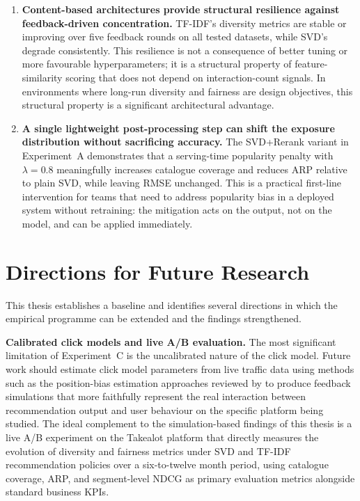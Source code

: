 \documentclass[11pt,a4paper]{report}
\begin{document}
\begin{enumerate}
    \item \textbf{Content-based architectures provide structural resilience against feedback-driven concentration.} TF-IDF's diversity metrics are stable or improving over five feedback rounds on all tested datasets, while SVD's degrade consistently. This resilience is not a consequence of better tuning or more favourable hyperparameters; it is a structural property of feature-similarity scoring that does not depend on interaction-count signals. In environments where long-run diversity and fairness are design objectives, this structural property is a significant architectural advantage.

    \item \textbf{A single lightweight post-processing step can shift the exposure distribution without sacrificing accuracy.} The SVD+Rerank variant in Experiment~A demonstrates that a serving-time popularity penalty with $\lambda = 0.8$ meaningfully increases catalogue coverage and reduces ARP relative to plain SVD, while leaving RMSE unchanged. This is a practical first-line intervention for teams that need to address popularity bias in a deployed system without retraining: the mitigation acts on the output, not on the model, and can be applied immediately.
\end{enumerate}

\section{Directions for Future Research}
\label{sec:conc_future}

This thesis establishes a baseline and identifies several directions in which the empirical programme can be extended and the findings strengthened.

\textbf{Calibrated click models and live A/B evaluation.} The most significant limitation of Experiment~C is the uncalibrated nature of the click model. Future work should estimate click model parameters from live traffic data using methods such as the position-bias estimation approaches reviewed by \citet{yao2021simulatedusers} to produce feedback simulations that more faithfully represent the real interaction between recommendation output and user behaviour on the specific platform being studied. The ideal complement to the simulation-based findings of this thesis is a live A/B experiment on the Takealot platform that directly measures the evolution of diversity and fairness metrics under SVD and TF-IDF recommendation policies over a six-to-twelve month period, using catalogue coverage, ARP, and segment-level NDCG as primary evaluation metrics alongside standard business KPIs.
\end{document}
